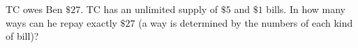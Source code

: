 TC owes Ben $\$27$. TC has an unlimited supply of $\$5$ and $\$1$ bills. In how many ways can he repay exactly $\$27$ (a way is determined by the numbers of each kind of bill)?
